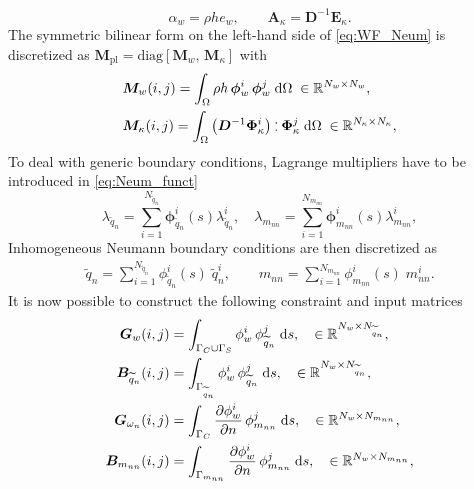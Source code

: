 \documentclass[letterpaper, 10 pt, conference]{ieeeconf}
\def\onedot{$\mathsurround0pt\ldotp$}
\def\cddot{%
	\mathbin{\vcenter{\baselineskip.67ex
			\hbox{\onedot}\hbox{\onedot}}%
}}
\begin{document}
\begin{equation}
\alpha_w = \rho h e_w, \qquad \bm{A}_{\kappa} = \bm{D}^{-1} \bm{E}_{\kappa}.
\end{equation}
The symmetric bilinear form on the left-hand side of \eqref{eq:WF_Neum} is discretized as $\bm{M}_{\text{pl}} = \text{diag}[\bm{M}_w,\, \bm{M}_\kappa]$ with
\begin{equation}
\begin{aligned}
&\bm{M}_w(i,j) = \int_{\Omega} \rho h \, \bm{\phi}_w^i \, \bm{\phi}_w^j \d\Omega \; \in \mathbb{R}^{N_w \times N_w}, \\
&\bm{M}_\kappa(i,j) = \int_{\Omega}  \left( \bm{D}^{-1} \bm{\Phi}_\kappa^i \right) \cddot \bm{\Phi}_\kappa^j \d\Omega \; \in \mathbb{R}^{N_\kappa \times N_\kappa},\\
\end{aligned}
\end{equation}
To deal with generic boundary conditions, Lagrange multipliers have to be introduced in \eqref{eq:Neum_funct}
\begin{equation}
\lambda_{\widetilde{q}_n} = \sum_{i = 1}^{N_{\widetilde{q}_n}} \bm{\phi}^i_{\widetilde{q}_n}(s) {\lambda}^i_{\widetilde{q}_n}, \quad
\lambda_{m_{nn}} = \sum_{i = 1}^{N_{m_{nn}}} \bm{\phi}^i_{m_{nn}}(s) {\lambda}^i_{m_{nn}},
\end{equation}
Inhomogeneous Neumann boundary conditions are then discretized as
\begin{equation}
\begin{aligned}
\widetilde{q}_n = \sum_{i = 1}^{N_{\widetilde{q}_n}} \phi_{\widetilde{q}_n}^i(s) \; \widetilde{q}_n^i, \qquad
m_{nn} = \sum_{i = 1}^{N_{m_{nn}}} \phi_{m_{nn}}^i(s) \; m_{nn}^i.
\end{aligned}
\end{equation}
It is now possible to construct the following constraint and input matrices
\begin{equation}
\begin{aligned}
\bm{G}_{w}(i,j) &= \int_{\Gamma_{C} \cup \Gamma_{S} } {\phi}_{w}^i \, {\phi}_{\widetilde{q}_n}^j \d{s}, \quad  \in \mathbb{R}^{N_w \times N_{\widetilde{q}_n}},\\
\bm{B}_{\widetilde{q}_n}(i,j) &= \int_{\Gamma_{\widetilde{q}_n}} {\phi}_{w}^i \, {\phi}_{\widetilde{q}_n}^j \d{s}, \quad  \in \mathbb{R}^{N_w \times N_{\widetilde{q}_n}}, \\
\bm{G}_{\omega_n}(i,j) &= \int_{\Gamma_{C}} \diffp{\phi_w^i}{n} \, \phi_{m_{nn}}^j \d{s}, \quad \in \mathbb{R}^{N_w \times N_{m_{nn}}}, \\
\bm{B}_{m_{nn}}(i,j) &= \int_{\Gamma_{m_{nn}}} \diffp{\phi_w^i}{n} \, \phi_{m_{nn}}^j \d{s}, \quad \in \mathbb{R}^{N_w \times N_{m_{nn}}},\\
\end{aligned} 
\end{equation}
\end{document}
